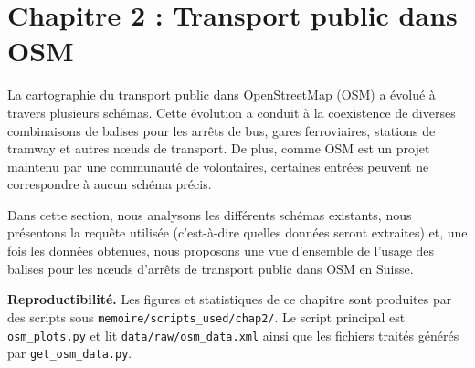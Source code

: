 \chapter{Chapitre 2 : Transport public dans OSM}

La cartographie du transport public dans OpenStreetMap (OSM) a évolué à travers plusieurs schémas. Cette évolution a conduit à la coexistence de diverses combinaisons de balises pour les arrêts de bus, gares ferroviaires, stations de tramway et autres nœuds de transport. De plus, comme OSM est un projet maintenu par une communauté de volontaires, certaines entrées peuvent ne correspondre à aucun schéma précis.

Dans cette section, nous analysons les différents schémas existants, nous présentons la requête utilisée (c’est-à-dire quelles données seront extraites) et, une fois les données obtenues, nous proposons une vue d’ensemble de l’usage des balises pour les nœuds d’arrêts de transport public dans OSM en Suisse.

\medskip
\noindent\textbf{Reproductibilité.} Les figures et statistiques de ce chapitre sont produites par des scripts sous \texttt{memoire/scripts\_used/chap2/}. Le script principal est \texttt{osm\_plots.py} et lit \texttt{data/raw/osm\_data.xml} ainsi que les fichiers traités générés par \texttt{get\_osm\_data.py}.

